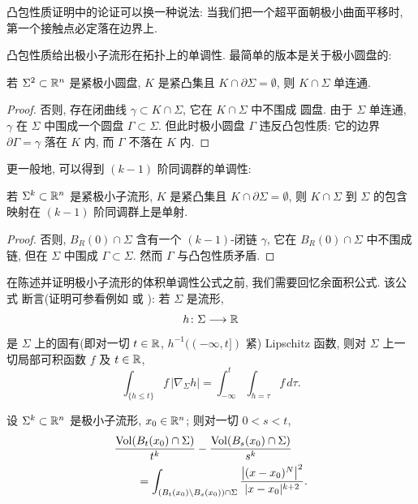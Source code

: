 凸包性质证明中的论证可以换一种说法: 当我们把一个超平面朝极小曲面平移时,
第一个接触点必定落在边界上.

凸包性质给出极小子流形在拓扑上的单调性. 最简单的版本是关于极小圆盘的:

\begin{corollary}
\label{cor:1.10}
若 $\Sigma^2\subset\mathbb{R}^n$ 是紧极小圆盘, $K$ 是紧凸集且
$K\cap\partial\Sigma=\emptyset$, 则 $K\cap\Sigma$ 单连通.
\end{corollary}

\begin{proof}
否则, 存在闭曲线 $\gamma\subset K\cap\Sigma$, 它在 $K\cap\Sigma$ 中不围成
圆盘. 由于 $\Sigma$ 单连通, $\gamma$ 在 $\Sigma$ 中围成一个圆盘
$\Gamma\subset\Sigma$. 但此时极小圆盘 $\Gamma$ 违反凸包性质: 它的边界
$\partial\Gamma=\gamma$ 落在 $K$ 内, 而 $\Gamma$ 不落在 $K$ 内.
\end{proof}

更一般地, 可以得到 $(k-1)$ 阶同调群的单调性:

\begin{lemma}
\label{lem:1.11}
若 $\Sigma^k\subset\mathbb{R}^n$ 是紧极小子流形, $K$ 是紧凸集且
$K\cap\partial\Sigma=\emptyset$, 则 $K\cap\Sigma$ 到 $\Sigma$ 的包含映射在
$(k-1)$ 阶同调群上是单射.
\end{lemma}

\begin{proof}
否则, $B_R(0)\cap\Sigma$ 含有一个 $(k-1)$-闭链 $\gamma$, 它在
$B_R(0)\cap\Sigma$ 中不围成链, 但在 $\Sigma$ 中围成 $\Gamma\subset\Sigma$.
然而 $\Gamma$ 与凸包性质矛盾.
\end{proof}

在陈述并证明极小子流形的体积单调性公式之前, 我们需要回忆余面积公式. 该公式
断言(证明可参看例如 \cite{Fe} 或 \cite{KP}): 若 $\Sigma$ 是流形,
\[
h\colon\Sigma\longrightarrow\mathbb{R}
\]
是 $\Sigma$ 上的固有(即对一切 $t\in\mathbb{R}$, $h^{-1}((-\infty,t])$ 紧)
Lipschitz 函数, 则对 $\Sigma$ 上一切局部可积函数 $f$ 及 $t\in\mathbb{R}$,
\begin{equation}
\int_{\{h\leq t\}}f\,|\nabla_{\Sigma}h|
 =\int_{-\infty}^{t}\int_{h=\tau}f\,d\tau.
\label{eq:1.59}
\end{equation}

\begin{proposition}[单调性公式]
\label{prop:1.12}
设 $\Sigma^k\subset\mathbb{R}^n$ 是极小子流形, $x_0\in\mathbb{R}^n$; 则对一切 $0<s<t$,
\begin{equation}
\begin{aligned}
&\frac{\operatorname{Vol}(B_t(x_0)\cap\Sigma)}{t^k}
 -\frac{\operatorname{Vol}(B_s(x_0)\cap\Sigma)}{s^k}\\
&\qquad=\int_{(B_t(x_0)\setminus B_s(x_0))\cap\Sigma}
 \frac{\bigl|(x-x_0)^{N}\bigr|^2}{|x-x_0|^{k+2}}.
\end{aligned}
\label{eq:1.60}
\end{equation}
\end{proposition}

